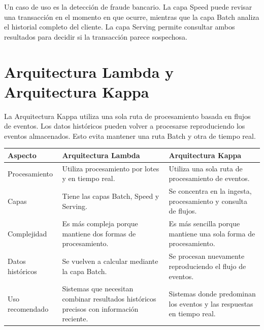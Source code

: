 Un caso de uso es la detección de fraude bancario. La capa Speed puede revisar
una transacción en el momento en que ocurre, mientras que la capa Batch
analiza el historial completo del cliente. La capa Serving permite consultar
ambos resultados para decidir si la transacción parece sospechosa.

\section{Arquitectura Lambda y Arquitectura Kappa}

La Arquitectura Kappa utiliza una sola ruta de procesamiento basada en flujos
de eventos. Los datos históricos pueden volver a procesarse reproduciendo los
eventos almacenados. Esto evita mantener una ruta Batch y otra de tiempo real.

\begin{center}
    \renewcommand{\arraystretch}{1.4}
    \small

    \begin{tabularx}{\textwidth}{|p{2.7cm}|X|X|}
        \hline
        \textbf{Aspecto} &
        \textbf{Arquitectura Lambda} &
        \textbf{Arquitectura Kappa} \\
        \hline

        Procesamiento &
        Utiliza procesamiento por lotes y en tiempo real. &
        Utiliza una sola ruta de procesamiento de eventos. \\
        \hline

        Capas &
        Tiene las capas Batch, Speed y Serving. &
        Se concentra en la ingesta, procesamiento y consulta de flujos. \\
        \hline

        Complejidad &
        Es más compleja porque mantiene dos formas de procesamiento. &
        Es más sencilla porque mantiene una sola forma de procesamiento. \\
        \hline

        Datos históricos &
        Se vuelven a calcular mediante la capa Batch. &
        Se procesan nuevamente reproduciendo el flujo de eventos. \\
        \hline

        Uso recomendado &
        Sistemas que necesitan combinar resultados históricos precisos con
        información reciente. &
        Sistemas donde predominan los eventos y las respuestas en tiempo
        real. \\
        \hline
    \end{tabularx}
\end{center}

